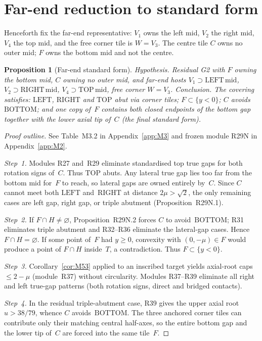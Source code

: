 \documentclass[11pt,reqno]{amsart}
\newtheorem{proposition}[theorem]{Proposition}
\theoremstyle{definition}
\newcommand{\BOTTOM}{\mathrm{BOTTOM}}
\newcommand{\RIGHT}{\mathrm{RIGHT}}
\newcommand{\TOP}{\mathrm{TOP}}
\newcommand{\LEFT}{\mathrm{LEFT}}
\begin{document}
\section{Far-end reduction to standard form}\label{sec:far}

Henceforth fix the far-end representative: $V_1$ owns the left mid, $V_2$ the
right mid, $V_4$ the top mid, and the free corner tile is $W=V_3$.  The centre
tile $C$ owns no outer mid; $F$ owns the bottom mid and not the centre.

\begin{proposition}[Far-end standard form]\label{prop:M71}
\emph{Hypothesis.} Residual G2 with $F$ owning the bottom mid, $C$ owning no
outer mid, and far-end hosts $V_1\supset\mathrm{LEFT\,mid}$,
$V_2\supset\mathrm{RIGHT\,mid}$, $V_4\supset\mathrm{TOP\,mid}$, free corner
$W=V_3$.
\emph{Conclusion.} The covering satisfies: $\LEFT$, $\RIGHT$ and $\TOP$ abut
via corner tiles; $F\subset\{y<0\}$; $C$ avoids~$\BOTTOM$; and one copy of~$F$
contains both closed endpoints of the bottom gap together with the lower axial
tip of~$C$ (the \emph{final standard form}).
\end{proposition}

\begin{proof}[Proof outline]
See Table~M3.2 in Appendix~\ref{app:M3} and frozen module R29N in
Appendix~\ref{app:M2}.

\emph{Step~1.} Modules R27 and~R29 eliminate standardised top true gaps for
both rotation signs of~$C$.  Thus $\TOP$ abuts.  Any lateral true gap lies too
far from the bottom mid for~$F$ to reach, so lateral gaps are owned entirely
by~$C$.  Since $C$ cannot meet both $\LEFT$ and~$\RIGHT$ at distance
$2\mu>\sqrt2$, the only remaining cases are left gap, right gap, or triple
abutment (Proposition~R29N.1).

\emph{Step~2.} If $F\cap H\neq\varnothing$, Proposition~R29N.2 forces $C$ to
avoid~$\BOTTOM$; R31 eliminates triple abutment and R32--R36 eliminate the
lateral-gap cases.  Hence $F\cap H=\varnothing$.  If some point of~$F$ had
$y\ge 0$, convexity with $(0,-\mu)\in F$ would produce a point of $F\cap H$
inside~$T$, a contradiction.  Thus $F\subset\{y<0\}$.

\emph{Step~3.} Corollary~\ref{cor:M53} applied to an inscribed target yields
axial-root caps $\le 2-\mu$ (module~R37) without circularity.  Modules
R37--R39 eliminate all right and left true-gap patterns (both rotation signs,
direct and bridged contacts).

\emph{Step~4.} In the residual triple-abutment case, R39 gives the upper axial
root $u>38/79$, whence $C$ avoids~$\BOTTOM$.  The three anchored corner tiles
can contribute only their matching central half-axes, so the entire bottom gap
and the lower tip of~$C$ are forced into the same tile~$F$.
\end{proof}
\end{document}
